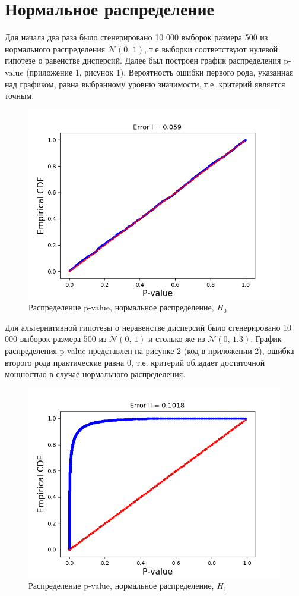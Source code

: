 \documentclass[12pt]{disser}
\begin{document}
\section*{Нормальное распределение}
Для начала два раза было сгенерировано 10 000 выборок размера 500 из нормального распределения $\mathcal{N}(0,\,1)$, т.е выборки соответствуют нулевой гипотезе о равенстве дисперсий. Далее был построен график распределения p-value (приложение 1, рисунок 1). Вероятность ошибки первого рода, указанная над графиком, равна выбранному уровню значимости, т.е. критерий является точным. 
\begin{figure}[hbt!]
	
	\centering
	
	\includegraphics[width=0.8\linewidth]{Pvalue_normal_h0.png}
	\caption{Распределение p-value, нормальное распределение, $H_0$}
	\label{fig:mpr}
	
\end{figure}

Для альтернативной гипотезы о неравенстве дисперсий было сгенерировано 10 000 выборок размера 500 из $\mathcal{N}(0,\,1)$ и столько же из $\mathcal{N}(0,\,1.3)$. График распределения p-value представлен на рисунке 2 (код в приложении 2), ошибка второго рода практические равна 0, т.е. критерий обладает достаточной мощностью в случае нормального распределения.

\begin{figure}[hbt!]
	
	\centering
	
	\includegraphics[width=0.8\linewidth]{Pvalue_normal_h1_alt.png}
	\caption{Распределение p-value, нормальное распределение, $H_1$}
	\label{fig:mpr}
	
\end{figure}
\end{document}
